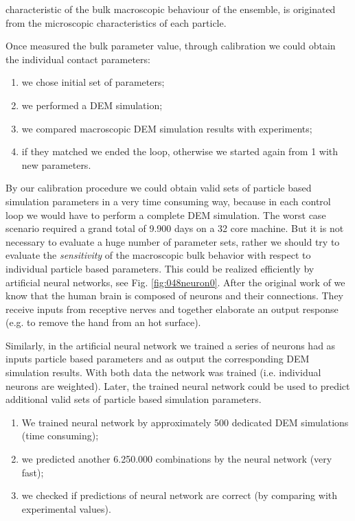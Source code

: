 characteristic of the bulk macroscopic behaviour of the ensemble, is originated from the microscopic
characteristics of each particle.

Once measured the bulk parameter value, through calibration we could obtain the
individual contact parameters:
\begin{enumerate}
\item{we chose initial set of parameters;}
\item{we performed a DEM simulation;}
\item{we compared macroscopic DEM simulation results with experiments;}
\item{if they matched we ended the loop, otherwise we started again from 1 with
new parameters.}
\end{enumerate}
By our calibration procedure we could obtain valid sets of particle based
simulation parameters in a very time consuming way, because in each control loop
we would have to perform a complete \acs{DEM} simulation.
The worst case scenario required a grand total of
9.900 days on a 32 core machine. 
But it is not necessary to evaluate a huge number of parameter sets,
rather we should try to evaluate the \textit{sensitivity} 
of the macroscopic bulk behavior with respect to individual particle based parameters.
This could be realized efficiently by artificial neural networks, see Fig.
\ref{fig:048neuron0}. 
After the original work of \citet{RefWorks:189} we know that the human brain is
composed of neurons and their connections. 
They receive inputs from receptive
nerves and together elaborate an output response (e.g. to remove the hand from
an hot surface).

Similarly, in the artificial neural network we trained a series of neurons had
as inputs particle based parameters and as output the corresponding \acs{DEM}
simulation results.
With both data the network was trained (i.e. individual neurons are
weighted).
Later, the trained neural network could be used to predict additional valid sets
of particle based simulation parameters.

\begin{enumerate}
\item{We trained neural network by approximately 500 dedicated DEM simulations
(time consuming);}
\item{we predicted another 6.250.000 combinations by the neural network (very
fast);}
\item{we checked if predictions of neural network are correct (by comparing with
experimental  values).}
\end{enumerate}

